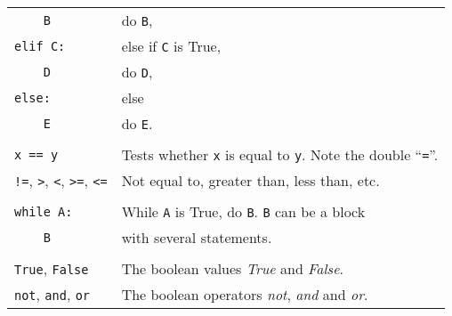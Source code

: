 \begin{tabular}{p{6cm}p{7.2cm}}
\verb!    B!    & \quad do \texttt{B},\\
\verb!elif C:!  & else if \texttt{C} is True,\\
\verb!    D!    & \quad do \texttt{D},\\
\verb!else:!    & else\\
\verb!    E!    & \quad do \texttt{E}.\\
\\
\texttt{x == y}          & Tests whether \texttt{x} is equal to
\texttt{y}.  Note the double ``\texttt{=}''.\\
\verb+!=+, \verb+>+, \verb+<+, \verb+>=+, \verb+<=+ 
                  & Not equal to, greater than, less than, etc.\\
\\
\verb!while A:! & While \texttt{A} is True, do \texttt{B}. \texttt{B} can be a block\\
\verb!    B!   &     with several statements.\\
\\
\verb!True!, \verb!False! & The boolean values \emph{True} and \emph{False}.\\
\verb+not+, \verb+and+, \verb+or+  & The boolean operators \emph{not}, \emph{and} and \emph{or}.
\end{tabular}
\vspace*{5pt}



